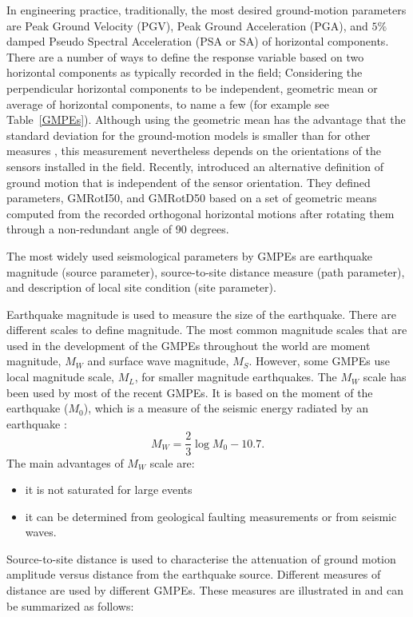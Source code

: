 In engineering practice, traditionally, the most desired
ground-motion parameters are Peak Ground Velocity (PGV), Peak Ground
Acceleration (PGA), and $5\%$ damped Pseudo Spectral Acceleration
(PSA or SA) of horizontal components. There are a number of ways to
define the response variable based on two horizontal components as
typically recorded in the field; Considering the perpendicular
horizontal components to be independent, geometric mean or average
of horizontal components, to name a few (for example see
Table~\ref{GMPEs}). Although using the geometric mean has the
advantage that the standard deviation for the ground-motion models
is smaller than for other measures \citep{eqrm_Beyer06}, this
measurement nevertheless depends on the orientations of the sensors
installed in the field. Recently, \citet{eqrm_Boore06} introduced an
alternative definition of ground motion that is independent of the
sensor orientation. They defined parameters, GMRotI50, and GMRotD50
based on a set of geometric means computed from the recorded
orthogonal horizontal motions after rotating them through a
non-redundant angle of 90 degrees.

The most widely used seismological parameters by GMPEs are
earthquake magnitude (source parameter), source-to-site distance
measure (path parameter), and description of local site condition
(site parameter).

Earthquake magnitude is used to measure the size of the earthquake.
There are different scales to define magnitude. The most common
magnitude scales that are used in the development of the GMPEs
throughout the world are moment magnitude, $M_W$ and surface wave
magnitude, $M_S$. However, some GMPEs use local magnitude scale,
$M_L$, for smaller magnitude earthquakes. The $M_W$ scale has been
used by most of the recent GMPEs. It is based on the moment of the
earthquake ($M_0$), which is a measure of the seismic energy
radiated by an earthquake \citep{eqrm_Hanks79}:
\begin{equation}\label{eq:MW}
M_W=\frac{2}{3}\log {M_0}-10.7.
\end{equation}
The main advantages of $M_W$ scale are:
\begin{itemize}
\item it is not saturated for large events
\item it can be determined from geological faulting measurements
or from seismic waves.
\end{itemize}
Source-to-site distance is used to characterise the attenuation of
ground motion amplitude versus distance from the earthquake source.
Different measures of distance are used by different GMPEs. These
measures are illustrated in  and can be
summarized as follows:

